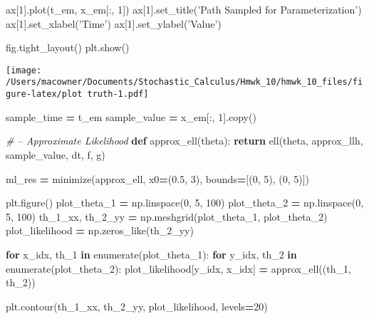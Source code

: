 \documentclass[]{article}
\newenvironment{Shaded}{\begin{snugshade}}{\end{snugshade}}
\newcommand{\BuiltInTok}[1]{#1}
\newcommand{\CommentTok}[1]{\textcolor[rgb]{0.56,0.35,0.01}{\textit{#1}}}
\newcommand{\ControlFlowTok}[1]{\textcolor[rgb]{0.13,0.29,0.53}{\textbf{#1}}}
\newcommand{\DecValTok}[1]{\textcolor[rgb]{0.00,0.00,0.81}{#1}}
\newcommand{\FloatTok}[1]{\textcolor[rgb]{0.00,0.00,0.81}{#1}}
\newcommand{\KeywordTok}[1]{\textcolor[rgb]{0.13,0.29,0.53}{\textbf{#1}}}
\newcommand{\NormalTok}[1]{#1}
\newcommand{\OperatorTok}[1]{\textcolor[rgb]{0.81,0.36,0.00}{\textbf{#1}}}
\newcommand{\StringTok}[1]{\textcolor[rgb]{0.31,0.60,0.02}{#1}}
\begin{document}
\begin{Shaded}
\begin{Highlighting}[]
\NormalTok{ax[}\DecValTok{1}\NormalTok{].plot(t_em, x_em[:, }\DecValTok{1}\NormalTok{])}
\NormalTok{ax[}\DecValTok{1}\NormalTok{].set_title(}\StringTok{'Path Sampled for Parameterization'}\NormalTok{)}
\NormalTok{ax[}\DecValTok{1}\NormalTok{].set_xlabel(}\StringTok{'Time'}\NormalTok{)}
\NormalTok{ax[}\DecValTok{1}\NormalTok{].set_ylabel(}\StringTok{'Value'}\NormalTok{)}

\NormalTok{fig.tight_layout()}
\NormalTok{plt.show()}
\end{Highlighting}
\end{Shaded}

\texttt{[image: /Users/macowner/Documents/Stochastic\_Calculus/Hmwk\_10/hmwk\_10\_files/figure-latex/plot truth-1.pdf]}

\begin{Shaded}
\begin{Highlighting}[]
\NormalTok{sample_time }\OperatorTok{=}\NormalTok{ t_em}
\NormalTok{sample_value }\OperatorTok{=}\NormalTok{ x_em[:, }\DecValTok{1}\NormalTok{].copy()}


\CommentTok{# -- Approximate Likelihood}
\KeywordTok{def}\NormalTok{ approx_ell(theta):}
    \ControlFlowTok{return}\NormalTok{ ell(theta, approx_llh, sample_value, dt, f, g)}


\NormalTok{ml_res }\OperatorTok{=}\NormalTok{ minimize(approx_ell, x0}\OperatorTok{=}\NormalTok{(}\FloatTok{0.5}\NormalTok{, }\DecValTok{3}\NormalTok{), bounds}\OperatorTok{=}\NormalTok{[(}\DecValTok{0}\NormalTok{, }\DecValTok{5}\NormalTok{), (}\DecValTok{0}\NormalTok{, }\DecValTok{5}\NormalTok{)])}

\NormalTok{plt.figure()}
\NormalTok{plot_theta_1 }\OperatorTok{=}\NormalTok{ np.linspace(}\DecValTok{0}\NormalTok{, }\DecValTok{5}\NormalTok{, }\DecValTok{100}\NormalTok{)}
\NormalTok{plot_theta_2 }\OperatorTok{=}\NormalTok{ np.linspace(}\DecValTok{0}\NormalTok{, }\DecValTok{5}\NormalTok{, }\DecValTok{100}\NormalTok{)}
\NormalTok{th_1_xx, th_2_yy }\OperatorTok{=}\NormalTok{ np.meshgrid(plot_theta_1, plot_theta_2)}
\NormalTok{plot_likelihood }\OperatorTok{=}\NormalTok{ np.zeros_like(th_2_yy)}

\ControlFlowTok{for}\NormalTok{ x_idx, th_1 }\KeywordTok{in} \BuiltInTok{enumerate}\NormalTok{(plot_theta_1):}
    \ControlFlowTok{for}\NormalTok{ y_idx, th_2 }\KeywordTok{in} \BuiltInTok{enumerate}\NormalTok{(plot_theta_2):}
\NormalTok{        plot_likelihood[y_idx, x_idx] }\OperatorTok{=}\NormalTok{ approx_ell((th_1, th_2))}

\NormalTok{plt.contour(th_1_xx, th_2_yy, plot_likelihood, levels}\OperatorTok{=}\DecValTok{20}\NormalTok{)}
\end{Highlighting}
\end{Shaded}
\end{document}
